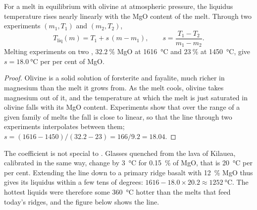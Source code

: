 \begin{proposition}\label{prop:b2:precambrian-earth:liquidus}
For a melt in equilibrium with olivine at atmospheric pressure, the liquidus temperature rises
nearly linearly with the MgO content of the melt. Through two experiments $(m_1, T_1)$ and
$(m_2, T_2)$,
\[
  T_{\text{liq}}(m) = T_1 + s\,(m - m_1), \qquad s = \frac{T_1 - T_2}{m_1 - m_2} .
\]
Melting experiments on two , $\qty{32.2}{\percent}$ MgO at \qty{1616}{\celsius} and
$\qty{23}{\percent}$ at \qty{1450}{\celsius}, give $s = \qty{18.0}{\celsius}$ per per cent of
MgO.
\end{proposition}

\begin{proof}
Olivine is a solid solution of forsterite and fayalite, much richer in magnesium than the melt
it grows from. As the melt cools, olivine takes magnesium out of it, and the temperature at
which the melt is just saturated in olivine falls with its MgO content. Experiments show that
over the range of a given family of melts the fall is close to linear, so that the line through
two experiments interpolates between them; $s = (1616 - 1450)/(32.2 - 23) = 166/9.2 = 18.04$.
\end{proof}

The coefficient is not special to . Glasses quenched from the lava of Kilauea,
calibrated in the same way, change by \qty{3}{\celsius} for \qty{0.15}{\percent} of MgO, that
is \qty{20}{\celsius} per per cent. Extending the  line down to a primary ridge basalt
with \qty{12}{\percent} MgO thus gives its liquidus within a few tens of degrees: $1616 -
18.0\times20.2 \approx \qty{1252}{\celsius}$. The hottest  liquids were therefore
some \qty{360}{\celsius} hotter than the melts that feed today's ridges, and the figure below
shows the line.


